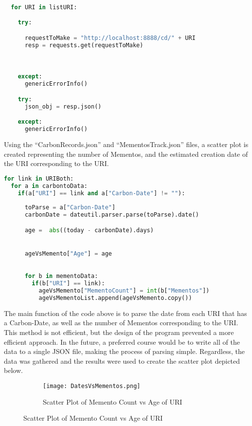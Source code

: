 \documentclass[11pt]{scrartcl} %
\begin{document}
\begin{lstlisting}[language = Python, caption=Make Carbon Date Request]

  for URI in listURI:

    try:

      requestToMake = "http://localhost:8888/cd/" + URI
      resp = requests.get(requestToMake)



    except:
      genericErrorInfo()

    try:
      json_obj = resp.json()

    except:
      genericErrorInfo()
\end{lstlisting} \bigskip \bigskip
 
 \tabto{2.0cm} Using the ``CarbonRecords.json'' and ``MementosTrack.json'' files, a scatter plot is created representing the number of Mementos, and the estimated creation date of the URI corresponding to the URI.
 

 \begin{lstlisting}[language = Python, caption= Number of Mementos vs Age in days]
    for link in URIBoth:
  for a in carbontoData:
    if(a["URI"] == link and a["Carbon-Date"] != ""):
      
      toParse = a["Carbon-Date"]
      carbonDate = dateutil.parser.parse(toParse).date()

      age =  abs((today - carbonDate).days)


      ageVsMemento["Age"] = age

      
      for b in mementoData:
        if(b["URI"] == link):
          ageVsMemento["MementoCount"] = int(b["Mementos"])
          ageVsMementoList.append(ageVsMemento.copy())
\end{lstlisting} \bigskip \bigskip

\tabto{2.0cm} The main function of the code above is to parse the date from each URI that has a Carbon-Date, as well as the number of Mementos corresponding to the URI. This method is not efficient, but the design of the program prevented a more efficient approach. In the future, a preferred course would be to write all of the data to a single JSON file, making the process of parsing simple. Regardless, the data was gathered and the results were used to create the scatter plot depicted below.

\begin{figure}[h!]
\begin{subfigure}[b]{0.9\linewidth }
    \texttt{[image: DatesVsMementos.png]}
    \caption{Scatter Plot of Memento Count vs Age of URI}
\end{subfigure}
\end{figure}
\end{document}
